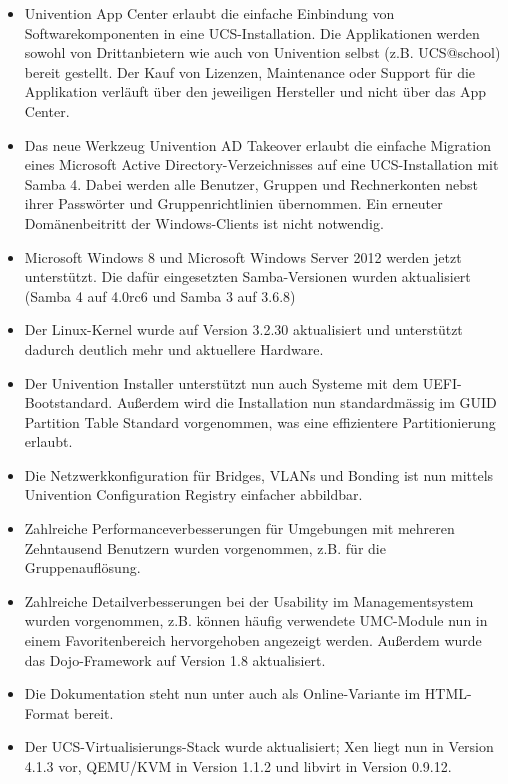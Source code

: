 \begin{itemize}
\item Univention App Center erlaubt die einfache Einbindung von
Softwarekomponenten in eine UCS-Installation. Die Applikationen werden
sowohl von Drittanbietern wie auch von Univention selbst
(z.B. UCS@school) bereit gestellt. Der Kauf von Lizenzen, Maintenance
oder Support für die Applikation verläuft über den jeweiligen
Hersteller und nicht über das App Center.

\item Das neue Werkzeug Univention AD Takeover erlaubt die einfache
Migration eines Microsoft Active Directory-Verzeichnisses auf eine
UCS-Installation mit Samba 4. Dabei werden alle Benutzer,
Gruppen und Rechnerkonten nebst ihrer Passwörter und
Gruppenrichtlinien übernommen. Ein erneuter Domänenbeitritt der
Windows-Clients ist nicht notwendig.

\item Microsoft Windows 8 und Microsoft Windows Server 2012 werden
jetzt unterstützt. Die dafür eingesetzten Samba-Versionen wurden
aktualisiert (Samba 4 auf 4.0rc6 und Samba 3 auf 3.6.8)

\item Der Linux-Kernel wurde auf Version 3.2.30 aktualisiert und
unterstützt dadurch deutlich mehr und aktuellere Hardware.

\item Der Univention Installer unterstützt nun auch Systeme mit dem
UEFI-Bootstandard. Außerdem wird die Installation nun standardmässig
im GUID Partition Table Standard vorgenommen, was eine effizientere
Partitionierung erlaubt.

\item Die Netzwerkkonfiguration für Bridges, VLANs und Bonding ist nun
mittels Univention Configuration Registry einfacher abbildbar.

\item Zahlreiche Performanceverbesserungen für Umgebungen mit mehreren
Zehntausend Benutzern wurden vorgenommen, z.B. für die
Gruppenauflösung.

\item Zahlreiche Detailverbesserungen bei der Usability im
Managementsystem wurden vorgenommen, z.B. können häufig verwendete
UMC-Module nun in einem Favoritenbereich hervorgehoben angezeigt
werden. Außerdem wurde das Dojo-Framework auf Version 1.8
aktualisiert.

\item Die Dokumentation steht nun
unter  auch als Online-Variante im
HTML-Format bereit.

\item Der UCS-Virtualisierungs-Stack wurde aktualisiert; Xen liegt nun
in Version 4.1.3 vor, QEMU/KVM in Version 1.1.2 und libvirt in Version
0.9.12.

\end{itemize}

